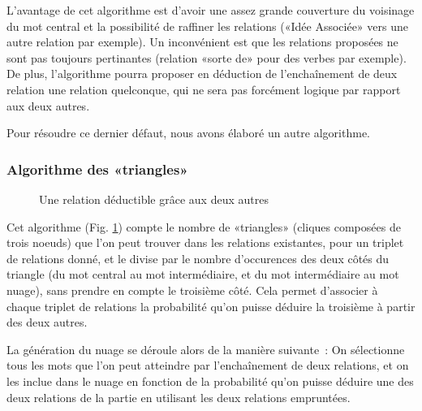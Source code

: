 \documentclass[a4paper,11pt,french]{article}
\begin{document}
L'avantage de cet algorithme est d'avoir une assez grande couverture du voisinage du mot central et la possibilité de raffiner les
relations («Idée Associée» vers une autre relation par exemple). Un inconvénient est que les relations proposées ne sont pas toujours
pertinantes (relation «sorte de» pour des verbes par exemple). De plus, l'algorithme pourra proposer en déduction de l'enchaînement de deux
relation une relation quelconque, qui ne sera pas forcément logique par rapport aux deux autres.

Pour résoudre ce dernier défaut, nous avons élaboré un autre algorithme.

\subsubsection{Algorithme des «triangles»}
\begin{figure}[ht]
  \centering
  \begin{center}
  \end{center}
  \caption{Une relation déductible grâce aux deux autres}
  \label{fig:algo-triangles}
\end{figure}

Cet algorithme (Fig. \ref{fig:algo-triangles}) compte le nombre de «triangles» (cliques composées de trois noeuds) que l'on peut trouver
dans les relations existantes, pour un triplet de relations donné, et le divise par le nombre d'occurences des deux côtés du triangle (du
mot central au mot intermédiaire, et du mot intermédiaire au mot nuage), sans prendre en compte le troisième côté. Cela permet d'associer à
chaque triplet de relations la probabilité qu'on puisse déduire la troisième à partir des deux autres.

La génération du nuage se déroule alors de la manière suivante~: On sélectionne tous les mots que l'on peut atteindre par l'enchaînement de
deux relations, et on les inclue dans le nuage en fonction de la probabilité qu'on puisse déduire une des deux relations de la partie en
utilisant les deux relations empruntées.
\end{document}
